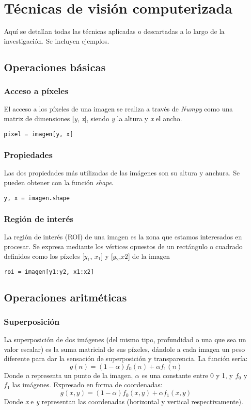 \chapter{Técnicas de visión computerizada}
Aquí se detallan todas las técnicas aplicadas o descartadas 
a lo largo de la investigación. Se incluyen ejemplos.
\section{Operaciones básicas}
\subsection{Acceso a píxeles}
El acceso a los píxeles de una imagen se realiza a través de
\emph{Numpy} como una matriz de dimensiones [\emph{y}, \emph{x}],
siendo \emph{y} la altura y \emph{x} el ancho.
\begin{verbatim}
pixel = imagen[y, x]
\end{verbatim}

\subsection{Propiedades}
Las dos propiedades más utilizadas de las imágenes son su altura y anchura.
Se pueden obtener con la función \emph{shape}.
\begin{verbatim}
y, x = imagen.shape
\end{verbatim}

\subsection{Región de interés}
La región de interés (ROI) de una imagen es la zona que estamos
interesados en procesar. Se expresa mediante los vértices opuestos de
un rectángulo o cuadrado definidos como los píxeles [$y_1$, $x_1$] y [$y_2$,$x2$]
de la imagen
\begin{verbatim}
roi = imagen[y1:y2, x1:x2]
\end{verbatim}

\section{Operaciones aritméticas}
\subsection{Superposición}
La superposición de dos imágenes (del mismo tipo, profundidad o una
que sea un valor escalar) es la suma matricial de sus píxeles,
dándole a cada imagen un peso diferente para dar la sensación
de superposición y transparencia. La función sería:
\begin{equation*}
g(n) = (1 - \alpha)f_0(n) + \alpha f_1(n)
\end{equation*}
Donde \emph{n} representa un punto de la imagen, \emph{$\alpha$} es 
una constante entre 0 y 1, y \emph{$f_0$} y \emph{$f_1$} las imágenes.
Expresado en forma de coordenadas:
\begin{equation*}
g(x, y) = (1 - \alpha)f_0(x, y) + \alpha f_1(x, y)
\end{equation*}
Donde \emph{x} e \emph{y} representan las coordenadas (horizontal y 
vertical respectivamente).


